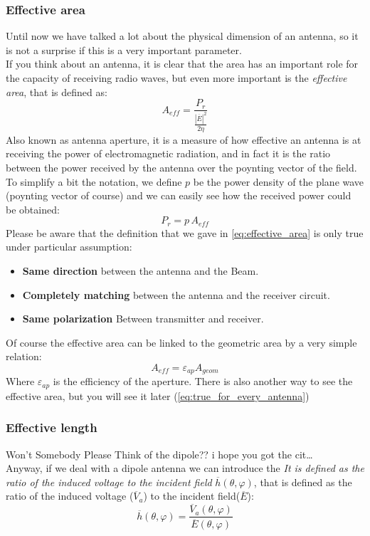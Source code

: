 \subsubsection*{Effective area}
Until now we have talked a lot about the physical dimension of an antenna, so it is not a surprise if this is a very important parameter.\\
If you think about an antenna, it is clear that the area has an important role for the capacity of receiving radio waves, but even more important is the \emph{effective area}, that is defined as:
\begin{equation}\label{eq:effective_area}
    A_{eff}=\frac{P_r}{\frac{|\overline{E}|^2}{2\eta}}
\end{equation}
Also known as antenna aperture, it is a measure of how effective an antenna is at receiving the power of electromagnetic radiation, and in fact it is the ratio between the power received by the antenna over the poynting vector of the field.\\
To simplify a bit the notation, we define $p$ be the power density of the plane wave (poynting vector of course) and we can easily see how the received power could be obtained:
\begin{equation}\label{eq:effective_area2}
    P_r=p\,A_{eff}
\end{equation}
Please be aware that the definition that we gave in \cref{eq:effective_area} is only true under particular assumption:
\begin{itemize}
    \item \textbf{Same direction} between the antenna and the Beam.
    \item \textbf{Completely matching} between the antenna and the receiver circuit.
    \item \textbf{Same polarization} Between transmitter and receiver.
\end{itemize}
Of course the effective area can be linked to the geometric area by a very simple relation:
\begin{equation}
    A_{eff}=\varepsilon_{ap} A_{geom}
\end{equation}
Where $\varepsilon_{ap}$ is the efficiency of the aperture.
There is also another way to see the effective area, but you will see it later (\cref{eq:true_for_every_antenna})
\subsubsection*{Effective length}
Won't Somebody Please Think of the dipole?? \footnotesize{i hope you got the cit\dots} \\
Anyway, if we deal with a dipole antenna we can introduce the \emph{It is defined as the ratio of the induced voltage to the incident field} $\overline{h}(\theta,\varphi)$, that is defined as the ratio of the induced voltage ($\overline{V}_a$) to the incident field($\overline{E}$):
\begin{equation}
    \overline{h}(\theta,\varphi)=\frac{\overline{V}_a(\theta,\varphi)}{\overline{E}(\theta,\varphi)}
\end{equation}
